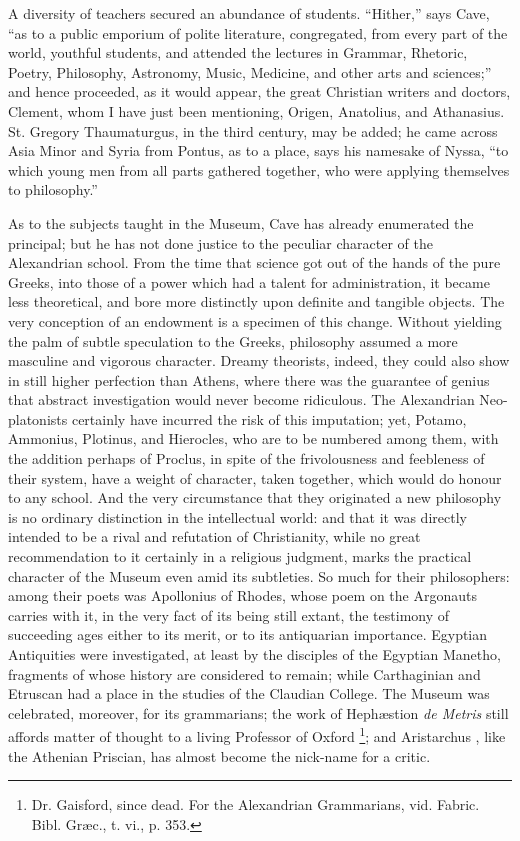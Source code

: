 A diversity of teachers secured an abundance of students.
``Hither,'' says Cave, ``as to a public emporium of polite
literature, congregated, from every part of the world, youthful
students, and attended the lectures in Grammar, Rhetoric, Poetry,
Philosophy, Astronomy, Music, Medicine, and other arts and
sciences;'' and hence proceeded, as it would appear, the great
Christian writers and doctors, Clement, whom I have just been
mentioning, Origen, Anatolius, and Athanasius. St. Gregory
Thaumaturgus, in the third century, may be added; he came across Asia
Minor and Syria from Pontus, as to a place, says his namesake of
Nyssa, ``to which young men from all parts gathered together, who
were applying themselves to philosophy.''

As to the subjects taught in the Museum, Cave has already
enumerated the principal; but he has not done justice to the peculiar
character of the Alexandrian school. From the time that science got
out of the hands of the pure Greeks, into those of a power which had a
talent for administration, it became less theoretical, and bore more
distinctly upon definite and tangible objects. The very
conception of an endowment is a specimen of this change. Without
yielding the palm of subtle speculation to the Greeks, philosophy
assumed a more masculine and vigorous character. Dreamy theorists,
indeed, they could also show in still higher perfection than Athens,
where there was the guarantee of genius that abstract investigation
would never become ridiculous. The Alexandrian Neo-platonists
certainly have incurred the risk of this imputation; yet, Potamo,
Ammonius, Plotinus, and Hierocles, who are to be numbered among them,
with the addition perhaps of Proclus, in spite of the frivolousness
and feebleness of their system, have a weight of character, taken
together, which would do honour to any school. And the very
circumstance that they originated a new philosophy is no ordinary
distinction in the intellectual world: and that it was directly
intended to be a rival and refutation of Christianity, while no great
recommendation to it certainly in a religious judgment, marks the
practical character of the Museum even amid its subtleties. So much
for their philosophers: among their poets was Apollonius of Rhodes,
whose poem on the Argonauts carries with it, in the very fact of its
being still extant, the testimony of succeeding ages either to its
merit, or to its antiquarian importance. Egyptian Antiquities were
investigated, at least by the disciples of the Egyptian Manetho,
fragments of whose history are considered to remain; while
Carthaginian and Etruscan had a place in the studies of the Claudian
College. The Museum was celebrated, moreover, for its grammarians; the
work of Hephæstion \emph{de Metris} still affords matter of thought
to a living Professor of Oxford \footnote{Dr. Gaisford, since dead. For the Alexandrian Grammarians, vid.
Fabric. Bibl. Græc., t. vi., p. 353.}; and Aristarchus , like the Athenian Priscian, has almost
become the nick-name for a critic.

